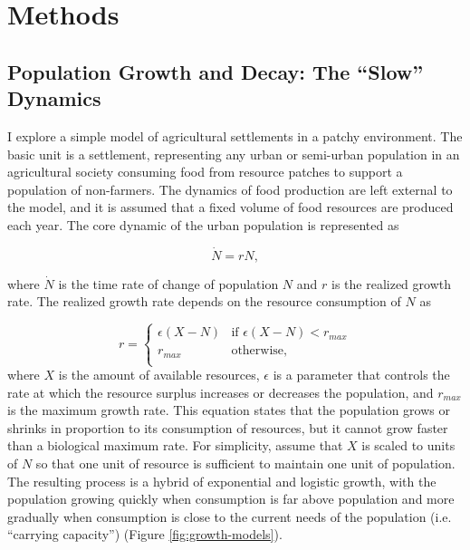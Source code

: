 \documentclass{article}
\begin{document}
\section{Methods}

\subsection{Population Growth and Decay: The ``Slow'' Dynamics}

I explore a simple model of agricultural settlements in a patchy environment. The basic unit is a settlement, representing any urban or semi-urban population in an agricultural society consuming food from resource patches to support a population of non-farmers. The dynamics of food production are left external to the model, and it is assumed that a fixed volume of food resources are produced each year. The core dynamic of the urban population is represented as

\begin{equation} 
  \dot{N} = rN,
  \label{eq:growth1}
\end{equation}

where $\dot{N}$ is the time rate of change of population $N$ and $r$ is the realized growth rate. The realized growth rate depends on the resource consumption of $N$ as

\begin{equation} 
  r =
  \begin{cases} 
      \epsilon \left(X -  N \right) & \text{if } \epsilon \left(X - N\right) < r_{\mathit{max}} \\
      r_{\mathit{max}} & \text{otherwise},\\
   \end{cases}
   \label{eq:rate}
\end{equation}
where $X$ is the amount of available resources, $\epsilon$ is a parameter that controls the rate at which the resource surplus increases or decreases the population, and $r_{\mathit{max}}$ is the maximum growth rate. This equation states that the population grows or shrinks in proportion to its consumption of resources, but it cannot grow faster than a biological maximum rate. For simplicity, assume that $X$ is scaled to units of $N$ so that one unit of resource is sufficient to maintain one unit of population. The resulting process is a hybrid of exponential and logistic growth, with the population growing quickly when consumption is far above population and more gradually when consumption is close to the current needs of the population (i.e. ``carrying capacity'') (Figure \ref{fig:growth-models}).
\end{document}
